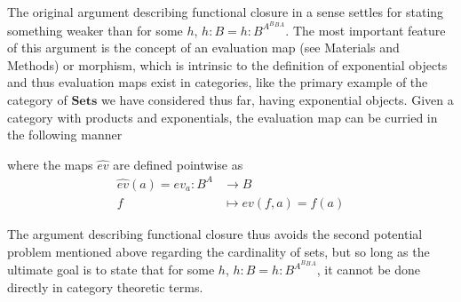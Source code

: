 The original argument describing functional closure in a sense settles for stating something weaker than for some $h$, $h:B = h:B^{A^B{^B{^A}}}$. The most important feature of this argument is the concept of an evaluation map (see Materials and Methods) or morphism, which is intrinsic to the definition of exponential objects and thus evaluation maps exist in categories, like the primary example of the category of $\mathbf{Sets}$ we have considered thus far, having exponential objects. Given a category with products and exponentials, the evaluation map can be curried in the following manner
\begin{prooftree}
\end{prooftree}
where the maps $\hat{ev}$ are defined pointwise as
\begin{align*}
\hat{ev}(a) = ev_a \colon B^A &\longrightarrow B\\
f &\longmapsto ev(f,a) = f(a)
\end{align*}

The argument describing functional closure thus avoids the second potential problem mentioned above regarding the cardinality of sets, but so long as the ultimate goal is to state that for some $h$, $h:B = h:B^{A^B{^B{^A}}}$, it cannot be done directly in category theoretic terms. 

